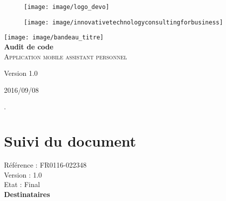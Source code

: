 \begin{titlepage}
  \begin{center}

    \begin{figure}[t]
      \begin{minipage}[b]{0.55\linewidth}
        \centering \texttt{[image: image/logo\_devo]}
      \end{minipage}
      \begin{minipage}[b]{0.48\linewidth}
        \centering \texttt{[image: image/innovativetechnologyconsultingforbusiness]}
      \end{minipage}
    \end{figure}

    \texttt{[image: image/bandeau\_titre]}\\[2cm]

    { \huge \bfseries Audit de code\\[0.3cm] }
    \textsc{\huge Application mobile assistant personnel}
  \end{center}

  \vspace{4cm}
  \Large{Version 1.0}\par
        {2016/09/08}
\end{titlepage}


.\vspace{0.5cm}

\section*{\textcolor{pinkpd}{Suivi du document}}
\vspace{0.6cm}

{\noindent \large{Référence : FR0116-022348\\[0.6cm]
    Version : 1.0\\[0.6cm]
    Etat : Final}}\\[2cm]

{\Large \textbf{Destinataires} }\\

